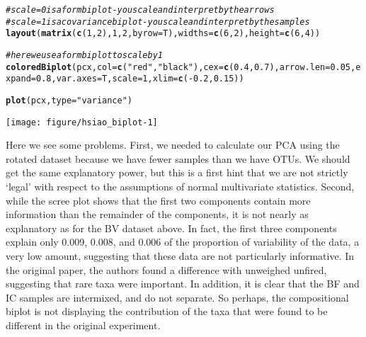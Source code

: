 \documentclass[11pt]{article}\usepackage[]{graphicx}\usepackage[]{color}
\makeatletter
\def\maxwidth{ %
  \ifdim\Gin@nat@width>\linewidth
    \linewidth
  \else
    \Gin@nat@width
  \fi
}
\newcommand{\hlnum}[1]{\textcolor[rgb]{0.686,0.059,0.569}{#1}}%
\newcommand{\hlstr}[1]{\textcolor[rgb]{0.192,0.494,0.8}{#1}}%
\newcommand{\hlcom}[1]{\textcolor[rgb]{0.678,0.584,0.686}{\textit{#1}}}%
\newcommand{\hlopt}[1]{\textcolor[rgb]{0,0,0}{#1}}%
\newcommand{\hlstd}[1]{\textcolor[rgb]{0.345,0.345,0.345}{#1}}%
\newcommand{\hlkwc}[1]{\textcolor[rgb]{0.333,0.667,0.333}{#1}}%
\newcommand{\hlkwd}[1]{\textcolor[rgb]{0.737,0.353,0.396}{\textbf{#1}}}%
\newenvironment{kframe}{%
 \def\at@end@of@kframe{}%
 \ifinner\ifhmode%
  \def\at@end@of@kframe{\end{minipage}}%
  \begin{minipage}{\columnwidth}%
 \fi\fi%
 \def\FrameCommand##1{\hskip\@totalleftmargin \hskip-\fboxsep
 \colorbox{shadecolor}{##1}\hskip-\fboxsep
     \hskip-\linewidth \hskip-\@totalleftmargin \hskip\columnwidth}%
 \MakeFramed {\advance\hsize-\width
   \@totalleftmargin\z@ \linewidth\hsize
   \@setminipage}}%
 {\par\unskip\endMakeFramed%
 \at@end@of@kframe}
\newenvironment{knitrout}{}{} %
\makeatother
\begin{document}
\begin{knitrout}
\begin{kframe}
\begin{alltt}
\hlcom{# scale = 0 is a form biplot - you scale and interpret by the arrows}
\hlcom{# scale = 1 is a covariance biplot - you scale and interpret by the samples}
\hlkwd{layout}\hlstd{(}\hlkwd{matrix}\hlstd{(}\hlkwd{c}\hlstd{(}\hlnum{1}\hlstd{,}\hlnum{2}\hlstd{),}\hlnum{1}\hlstd{,}\hlnum{2}\hlstd{,} \hlkwc{byrow}\hlstd{=T),} \hlkwc{widths}\hlstd{=}\hlkwd{c}\hlstd{(}\hlnum{6}\hlstd{,}\hlnum{2}\hlstd{),} \hlkwc{height}\hlstd{=}\hlkwd{c}\hlstd{(}\hlnum{6}\hlstd{,}\hlnum{4}\hlstd{))}

\hlcom{# here we use a form biplot to scale by 1}
\hlkwd{coloredBiplot}\hlstd{(pcx,} \hlkwc{col}\hlstd{=}\hlkwd{c}\hlstd{(}\hlstr{"red"}\hlstd{,} \hlstr{"black"}\hlstd{),} \hlkwc{cex}\hlstd{=}\hlkwd{c}\hlstd{(}\hlnum{0.4}\hlstd{,} \hlnum{0.7}\hlstd{),} \hlkwc{arrow.len}\hlstd{=}\hlnum{0.05}\hlstd{,} \hlkwc{expand}\hlstd{=}\hlnum{0.8}\hlstd{,}\hlkwc{var.axes}\hlstd{=T,} \hlkwc{scale}\hlstd{=}\hlnum{1}\hlstd{,} \hlkwc{xlim}\hlstd{=}\hlkwd{c}\hlstd{(}\hlopt{-}\hlnum{0.2}\hlstd{,}\hlnum{0.15}\hlstd{))}

\hlkwd{plot}\hlstd{(pcx,} \hlkwc{type}\hlstd{=}\hlstr{"variance"}\hlstd{)}
\end{alltt}
\end{kframe}
\texttt{[image: figure/hsiao\_biplot-1]} 

\end{knitrout}

Here we see some problems. First, we needed to calculate our PCA using the rotated dataset because we have fewer samples than we have OTUs. We should get the same explanatory power, but this is a first hint that we are not strictly `legal' with respect to the assumptions of normal multivariate statistics. Second, while the scree plot shows that the first two components contain  more information than the remainder of the components, it is not nearly as explanatory as for the BV dataset above. In fact, the first three components explain only 0.009, 
0.008, and 0.006 of the proportion of variability of the data, a very low amount, suggesting that these data are not particularly informative. In the original paper, the authors found a difference with unweighed unfired, suggesting that rare taxa were important. In addition, it is clear that the BF and IC samples are intermixed, and do not separate. So perhaps, the compositional biplot is not displaying the contribution of the taxa that were found to be different in the original experiment. 
\end{document}
